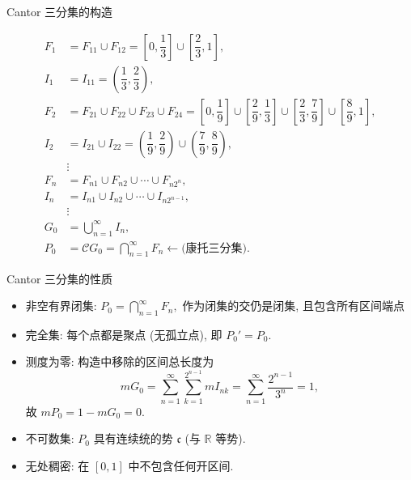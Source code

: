 
\begin{frame}{Cantor 三分集的构造}

{\smaller[1]
\begin{align*}
F_1 & = F_{11} \cup F_{12} = \left[ 0, \dfrac{1}{3} \right] \cup \left[ \dfrac{2}{3}, 1 \right], \\
I_1 & = I_{11} = \left( \dfrac{1}{3}, \dfrac{2}{3} \right), \\
F_2 & = F_{21} \cup F_{22} \cup F_{23} \cup F_{24} = \left[ 0, \dfrac{1}{9} \right] \cup \left[ \dfrac{2}{9}, \dfrac{1}{3} \right] \cup \left[ \dfrac{2}{3}, \dfrac{7}{9} \right] \cup \left[ \dfrac{8}{9}, 1 \right], \\
I_2 & = I_{21} \cup I_{22} = \left( \dfrac{1}{9}, \dfrac{2}{9} \right) \cup \left( \dfrac{7}{9}, \dfrac{8}{9} \right), \\
& \vdots \\
F_n & = F_{n1} \cup F_{n2} \cup \cdots \cup F_{n2^{n}}, \\
I_n & = I_{n1} \cup I_{n2} \cup \cdots \cup I_{n2^{n-1}}, \\
& \vdots \\
G_0 & = \bigcup_{n=1}^{\infty} I_n, \\
P_0 & = \mathscr{C} G_0 = \bigcap_{n=1}^{\infty} F_n \longleftarrow \text{(康托三分集)}.
\end{align*}
}

\end{frame}


\begin{frame}{Cantor 三分集的性质}

\begin{itemize}
\item \alert{非空有界闭集}: $\displaystyle P_0 = \bigcap_{n=1}^{\infty} F_n,$ 作为闭集的交仍是闭集, 且包含所有区间端点
\item \alert{完全集}: 每个点都是聚点 (无孤立点), 即 $P_0' = P_0.$
\item \alert{测度为零}: 构造中移除的区间总长度为
\[
m G_0 = \sum_{n=1}^{\infty} \sum_{k=1}^{2^{n-1}} m I_{nk}= \sum_{n=1}^{\infty} \frac{2^{n-1}}{3^n} = 1,
\]
故 $m P_0 = 1 - m G_0 = 0.$
\item \alert{不可数集}: $P_0$ 具有连续统的势 $\mathfrak{c}$ (与 $\mathbb{R}$ 等势).
\item \alert{无处稠密}: 在 $[0,1]$ 中不包含任何开区间.
\end{itemize}

\end{frame}


